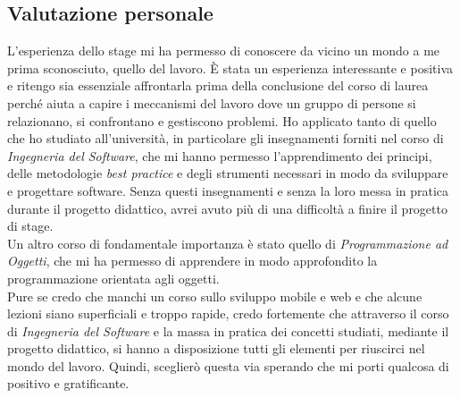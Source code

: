 \subsection{Valutazione personale}
L'esperienza dello stage mi ha permesso di conoscere da vicino un mondo a me prima sconosciuto, quello del lavoro. È stata un esperienza interessante e positiva e ritengo sia essenziale affrontarla prima della conclusione del corso di laurea perché aiuta a capire i meccanismi del lavoro dove un gruppo di persone si relazionano, si confrontano e gestiscono problemi. Ho applicato tanto di quello che ho studiato all'università, in particolare gli insegnamenti forniti nel corso di \textit{Ingegneria del Software}, che mi hanno permesso l'apprendimento dei principi, delle metodologie \textit{best practice} e degli strumenti necessari in modo da sviluppare e progettare software. Senza questi insegnamenti e senza la loro messa in pratica durante il progetto didattico, avrei avuto più di una difficoltà a finire il progetto di stage.\\
Un altro corso di fondamentale importanza è stato quello di \textit{Programmazione ad Oggetti}, che mi ha permesso di apprendere in modo approfondito la programmazione orientata agli oggetti. \\
Pure se credo che manchi un corso sullo sviluppo mobile e web e che alcune lezioni siano superficiali e troppo rapide, credo fortemente che attraverso il corso di \textit{Ingegneria del Software} e la massa in pratica dei concetti studiati, mediante il progetto didattico, si hanno a disposizione tutti gli elementi per riuscirci nel mondo del lavoro. Quindi, sceglierò questa via sperando che mi porti qualcosa di positivo e gratificante.